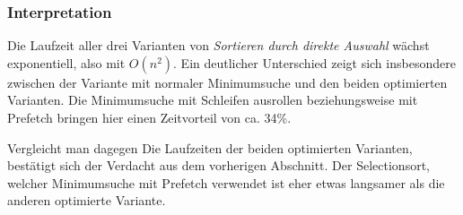 \subsubsection{Interpretation}

Die Laufzeit aller drei Varianten von \textit{Sortieren durch direkte Auswahl} wächst exponentiell, also mit $O(n^2)$. Ein deutlicher Unterschied zeigt sich insbesondere zwischen der Variante mit normaler Minimumsuche und den beiden optimierten Varianten. Die Minimumsuche mit Schleifen ausrollen beziehungsweise mit Prefetch bringen hier einen Zeitvorteil von ca. 34\%.

Vergleicht man dagegen Die Laufzeiten der beiden optimierten Varianten, bestätigt sich der Verdacht aus dem vorherigen Abschnitt. Der Selectionsort, welcher Minimumsuche mit Prefetch verwendet ist eher etwas langsamer als die anderen optimierte Variante.
